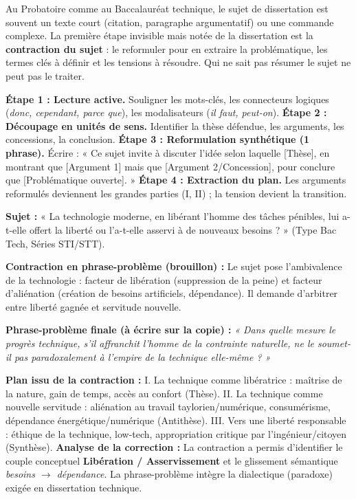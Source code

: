 \documentclass[11pt]{article}
\newcommand{\cle}[1]{{\popxbold\color{popdark}#1}}
\newcounter{popsec}
\newcounter{popsub}
\newcommand{\courssub}[1]{%
  \stepcounter{popsub}%
  \par\vspace{9pt}\noindent{\popxbold\fontsize{11.5}{13}\selectfont\color{popink}{\color{poporange}\thepopsec.\thepopsub}\hspace{6pt}#1}\par\nopagebreak\vspace{4pt}
}
\begin{document}
\courssub{Le résumé, propédeutique à la dissertation (Séance 10)}

\begin{aretenir}
Au Probatoire comme au Baccalauréat technique, le sujet de dissertation est souvent un texte court (citation, paragraphe argumentatif) ou une commande complexe. La première étape invisible mais notée de la dissertation est la \textbf{contraction du sujet} : le reformuler pour en extraire la \cle{problématique}, les \cle{termes clés} à définir et les \cle{tensions} à résoudre. Qui ne sait pas résumer le sujet ne peut pas le traiter.
\end{aretenir}

\begin{methode}
\textbf{Étape 1 : Lecture active.} Souligner les mots-clés, les connecteurs logiques (\emph{donc, cependant, parce que}), les modalisateurs (\emph{il faut, peut-on}).
\textbf{Étape 2 : Découpage en unités de sens.} Identifier la thèse défendue, les arguments, les concessions, la conclusion.
\textbf{Étape 3 : Reformulation synthétique (1 phrase).} Écrire : « Ce sujet invite à discuter l'idée selon laquelle [Thèse], en montrant que [Argument 1] mais que [Argument 2/Concession], pour conclure que [Problématique ouverte]. »
\textbf{Étape 4 : Extraction du plan.} Les arguments reformulés deviennent les grandes parties (I, II) ; la tension devient la transition.
\end{methode}

\begin{exoresolu}
\textbf{Sujet :} « La technologie moderne, en libérant l'homme des tâches pénibles, lui a-t-elle offert la liberté ou l'a-t-elle asservi à de nouveaux besoins ? » (Type Bac Tech, Séries STI/STT).

\textbf{Contraction en phrase-problème (brouillon) :}
Le sujet pose l'ambivalence de la technologie : facteur de libération (suppression de la peine) et facteur d'aliénation (création de besoins artificiels, dépendance). Il demande d'arbitrer entre liberté gagnée et servitude nouvelle.

\textbf{Phrase-problème finale (à écrire sur la copie) :}
\emph{« Dans quelle mesure le progrès technique, s'il affranchit l'homme de la contrainte naturelle, ne le soumet-il pas paradoxalement à l'empire de la technique elle-même ? »}

\textbf{Plan issu de la contraction :}
I. La technique comme libératrice : maîtrise de la nature, gain de temps, accès au confort (Thèse).
II. La technique comme nouvelle servitude : aliénation au travail taylorien/numérique, consumérisme, dépendance énergétique/numérique (Antithèse).
III. Vers une liberté responsable : éthique de la technique, low-tech, appropriation critique par l'ingénieur/citoyen (Synthèse).
\tcblower
\textbf{Analyse de la correction :} La contraction a permis d'identifier le couple conceptuel \textbf{Libération / Asservissement} et le glissement sémantique \emph{besoins $\to$ dépendance}. La phrase-problème intègre la dialectique (paradoxe) exigée en dissertation technique.
\end{exoresolu}
\end{document}
